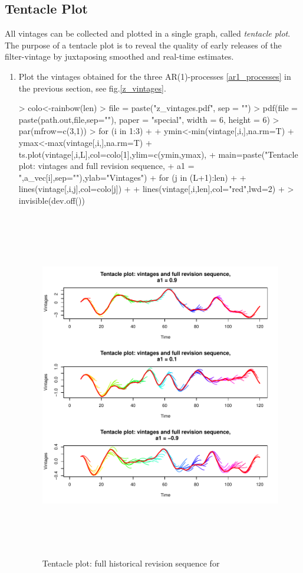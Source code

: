 \documentclass[a4paper]{book}
\begin{document}
\subsection{Tentacle Plot}\label{back_tentacle}




{All} vintages can be collected and plotted in a single graph, called \emph{tentacle plot}. The purpose of a tentacle plot is to reveal the quality of early releases of the filter-vintage by juxtaposing smoothed and real-time estimates. 
\begin{enumerate}
\item Plot the vintages obtained for the three AR(1)-processes \ref{ar1_processes} in the previous section, see fig.\ref{z_vintages}.  
\begin{Schunk}
\begin{Sinput}
> colo<-rainbow(len)
> file = paste("z_vintages.pdf", sep = "")
> pdf(file = paste(path.out,file,sep=""), paper = "special", width = 6, height = 6)
> par(mfrow=c(3,1))
> for (i in 1:3)
+ {
+   ymin<-min(vintage[,i,],na.rm=T)
+   ymax<-max(vintage[,i,],na.rm=T)
+   ts.plot(vintage[,i,L],col=colo[1],ylim=c(ymin,ymax),
+   main=paste("Tentacle plot: vintages and full revision sequence,
+   a1 = ",a_vec[i],sep=""),ylab="Vintages")
+   for (j in (L+1):len)
+   {
+     lines(vintage[,i,j],col=colo[j])
+   }
+   lines(vintage[,i,len],col="red",lwd=2)
+ }
> invisible(dev.off())
\end{Sinput}
\end{Schunk}
\begin{figure}[H]\begin{center}\includegraphics[height=6in, width=6in]{z_vintages.pdf}\caption{Tentacle plot: full historical revision sequence for
}
\end{center}
\end{figure}
\end{enumerate}
\end{document}
